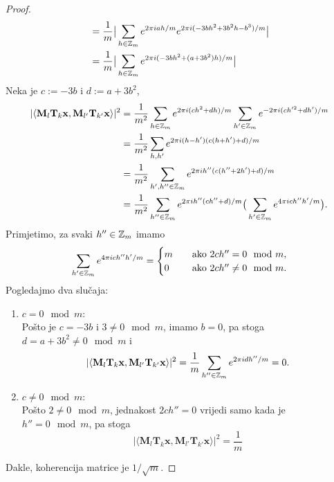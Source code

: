 \documentclass[a4paper,twoside,12pt]{memoir} %
\newcommand{\vect}[1]{\mathbf{#1}}
\renewcommand{\vec}{\vect}
\begin{document}
\begin{proof}
\begin{align*}
        &= \frac{1}{m} \big |   \sum_{h \in \mathbb{Z}_m} e^{2 \pi iah/m}e^{2 \pi i (-3bh^2 + 3b^2h - b^3)/m}  \big | \\
        &= \frac{1}{m} \big |   \sum_{h \in \mathbb{Z}_m} e^{2 \pi i (-3bh^2 + (a+3b^2)h)/m}  \big |
    \end{align*}
    Neka je $c := -3b$ i $d := a + 3b^2$,
    \begin{align*}
        |\langle \vec M_l \vec T_k \vec x, \vec M_{l'} \vec T_{k'} \vec x \rangle|^2 &= \frac{1}{m^2} \sum_{h \in \Z_m} e^{2 \pi i (ch^2 + dh)/m} \sum_{h' \in \Z_m} e^{-2 \pi i (ch'^2 + dh')/m}\\
        &= \frac{1}{m^2} \sum_{h,h'} e^{2 \pi i (h-h')(c(h+h') + d)/m} \\ 
        &= \frac{1}{m^2} \sum_{h',h'' \in \Z_m} e^{2 \pi i h''(c(h''+2h') + d)/m} \\
        &= \frac{1}{m^2} \sum_{h'' \in \Z_m} e^{2 \pi i h''(ch''+d)/m} \big ( \sum_{h' \in \Z_m} e^{4 \pi ich''h'/m} \big).
    \end{align*}
    Primjetimo, za svaki $h'' \in \mathbb{Z}_m$ imamo
    \begin{equation*}
          \sum_{h' \in \mathbb{Z}_m} e^{4 \pi ich''h'/m} =  
          \begin{cases}
              m \quad &\text{ako } 2ch'' = 0 \mod m, \\
              0 \quad &\text{ako } 2ch'' \neq 0 \mod m.
          \end{cases}
    \end{equation*}
    Pogledajmo dva slu\v{c}aja:
    \begin{enumerate}
        \item $c = 0 \mod m$: \\
            Po\v{s}to je $c = -3b$ i $3 \neq 0 \mod m$, imamo $b = 0$, pa stoga $d = a +3b^2 \neq 0 \mod m$ i 
            \begin{equation*}
                |\langle \vec M_l \vec T_k \vec x, \vec M_{l'} \vec T_{k'} \vec x \rangle|^2 = \frac{1}{m} \sum_{h'' \in \Z_m} e^{2 \pi idh''/m} = 0.
            \end{equation*}

        \item $c \neq 0 \mod m$: \\
            Po\v{s}to $2 \neq 0 \mod m$, jednakost $2ch'' = 0$ vrijedi samo kada je $h'' = 0 \mod m$, pa stoga
            \begin{equation*}
                |\langle \vec M_l \vec T_k \vec x, \vec M_{l'} \vec T_{k'} \vec x \rangle|^2 = \frac{1}{m} 
            \end{equation*}
    \end{enumerate}
    Dakle, koherencija matrice je $1/\sqrt{m}$.
\end{proof}
\end{document}
